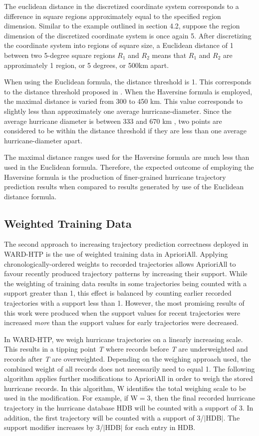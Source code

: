 \documentclass[12pt,conference]{IEEEtran}
\begin{document}
The euclidean distance in the discretized coordinate system corresponds to a difference in square regions approximately equal to the specified region dimension. Similar to the example outlined in section 4.2, suppose the region dimension of the discretized coordinate system is once again 5. After discretizing the coordinate system into regions of square size, a Euclidean distance of 1 between two 5-degree square regions $R_{1}$ and $R_{2}$ means that $R_{1}$ and $R_{2}$ are approximately 1 region, or 5 degrees, or 500km apart. 

When using the Euclidean formula, the distance threshold is 1. This corresponds to the distance threshold proposed in \cite{major-hurricane-model}. When the Haversine formula is employed, the maximal distance is varied from 300 to 450 km. This value corresponds to slightly less than approximately one average hurricane-diameter. Since the average hurricane diameter is between 333 and 670 km \cite{hurricane-distances}, two points are considered to be within the distance threshold if they are less than one average hurricane-diameter apart. 

The maximal distance ranges used for the Haversine formula are much less than used in the Euclidean formula. Therefore, the expected outcome of employing the Haversine formula is the production of finer-grained hurricane trajectory prediction results when compared to results generated by use of the Euclidean distance formula.

\subsection{Weighted Training Data}

The second approach to increasing trajectory prediction correctness deployed in WARD-HTP is the use of weighted training data in AprioriAll. Applying chronologically-ordered weights to recorded trajectories allows AprioriAll to favour recently produced trajectory patterns by increasing their support. While the weighting of training data results in some trajectories being counted with a support greater than 1, this effect is balanced by counting earlier recorded trajectories with a support less than 1. However, the most promising results of this work were produced when the support values for recent trajectories were increased \textit{more} than the support values for early trajectories were decreased.

In WARD-HTP, we weigh hurricane trajectories on a linearly increasing scale. This results in a tipping point \textit{T} where records before \textit{T} are underweighted and records after \textit{T} are overweighted. Depending on the weighing approach used, the combined weight of all records does not necessarily need to equal 1. The following algorithm applies further modifications to AprioriAll in order to weigh the stored hurricane records. In this algorithm, W identifies the total weighing scale to be used in the modification. For example, if W$=$3, then the final recorded hurricane trajectory in the hurricane database HDB will be counted with a support of 3. In addition, the first trajectory will be counted with a support of 3/$\lvert$HDB$\rvert$. The support modifier increases by 3/$\lvert$HDB$\rvert$ for each entry in HDB.
\end{document}
